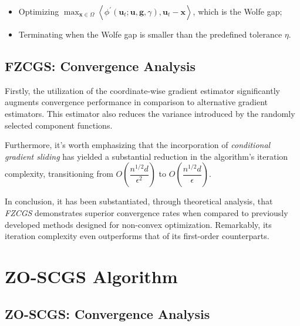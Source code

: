 \begin{multicols}{2}
\begin{itemize}[left=0pt,labelindent=0pt]
\item Optimizing $\max _{\mathbf{x} \in \Omega}\left\langle\phi^{\prime}\left(\mathbf{u}_t ; \mathbf{u}, \mathbf{g}, \gamma\right), \mathbf{u}_t-\mathbf{x}\right\rangle$,
 which is the Wolfe gap;
 
\item Terminating when the Wolfe gap is smaller than the predefined tolerance $\eta$.

\end{itemize}

\subsection{FZCGS: Convergence Analysis}

Firstly, the utilization of the coordinate-wise gradient estimator significantly 
augments convergence performance in comparison to alternative gradient estimators. 
This estimator also reduces the variance introduced by the randomly selected component 
functions.

Furthermore, it's worth emphasizing that the incorporation of 
\textit{conditional gradient sliding} has yielded a substantial 
reduction in the algorithm's iteration complexity, transitioning from 
$O\left(\dfrac{n^{1/2}d}{\epsilon^2}\right)$
to $O\left(\dfrac{n^{1/2}d}{\epsilon}\right)$.

In conclusion, it has been substantiated, through theoretical analysis, 
that \textit{FZCGS} demonstrates superior convergence rates when 
compared to previously developed methods designed for non-convex optimization. 
Remarkably, its iteration complexity even outperforms that of its first-order counterparts.

\section{ZO-SCGS Algorithm}

\subsection{ZO-SCGS: Convergence Analysis}
 
\medskip
\printbibliography %

\end{multicols}%

 
  















